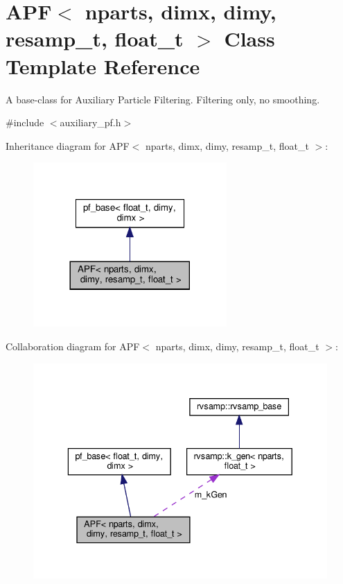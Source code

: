 \hypertarget{classAPF}{}\section{A\+PF$<$ nparts, dimx, dimy, resamp\+\_\+t, float\+\_\+t $>$ Class Template Reference}
\label{classAPF}


A base-\/class for Auxiliary Particle Filtering. Filtering only, no smoothing.  




{\ttfamily \#include $<$auxiliary\+\_\+pf.\+h$>$}



Inheritance diagram for A\+PF$<$ nparts, dimx, dimy, resamp\+\_\+t, float\+\_\+t $>$\+:
\nopagebreak
\begin{figure}[H]
\begin{center}
\leavevmode
\includegraphics[width=209pt]{classAPF__inherit__graph}
\end{center}
\end{figure}


Collaboration diagram for A\+PF$<$ nparts, dimx, dimy, resamp\+\_\+t, float\+\_\+t $>$\+:
\nopagebreak
\begin{figure}[H]
\begin{center}
\leavevmode
\includegraphics[width=336pt]{classAPF__coll__graph}
\end{center}
\end{figure}
